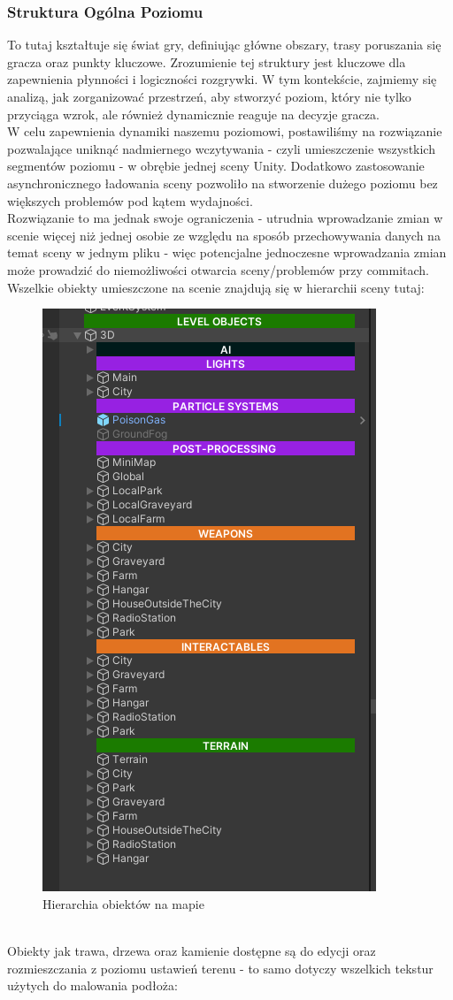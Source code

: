 \subsubsection{Struktura Ogólna Poziomu}
To tutaj kształtuje się świat gry, definiując główne obszary, trasy poruszania się gracza oraz punkty kluczowe. Zrozumienie tej struktury jest kluczowe dla zapewnienia płynności i logiczności rozgrywki. W tym kontekście, zajmiemy się analizą, jak zorganizować przestrzeń, aby stworzyć poziom, który nie tylko przyciąga wzrok, ale również dynamicznie reaguje na decyzje gracza.\\
W celu zapewnienia dynamiki naszemu poziomowi, postawiliśmy na rozwiązanie pozwalające uniknąć nadmiernego wczytywania - czyli umieszczenie wszystkich segmentów poziomu - w obrębie jednej sceny Unity.
Dodatkowo zastosowanie asynchronicznego ładowania sceny pozwoliło na stworzenie dużego poziomu bez większych problemów pod kątem wydajności.\\
Rozwiązanie to ma jednak swoje ograniczenia - utrudnia wprowadzanie zmian w scenie więcej niż jednej osobie ze względu na sposób przechowywania danych na temat sceny w jednym pliku - więc potencjalne jednoczesne wprowadzania zmian może prowadzić do niemożliwości otwarcia sceny/problemów przy commitach.
Wszelkie obiekty umieszczone na scenie znajdują się w hierarchii sceny tutaj:\\
\begin{figure}[h!]
    \centering
    \includegraphics[width=0.41\linewidth]{Images/lvlhierarchy.png}
    \caption{Hierarchia obiektów na mapie}
    \label{fig:lvlhierarchy}
\end{figure}
\\Obiekty jak trawa, drzewa oraz kamienie dostępne są do edycji oraz rozmieszczania z poziomu ustawień terenu - to samo dotyczy wszelkich tekstur użytych do malowania podłoża:
